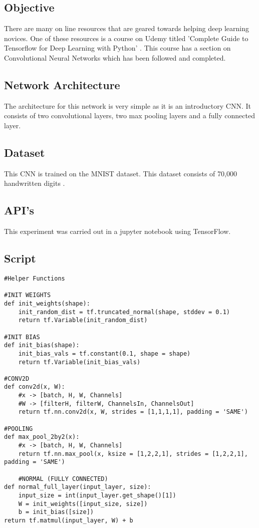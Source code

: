 \subsection*{Objective}
There are many on line resources that are geared towards helping deep learning novices.
One of these resources is a course on Udemy titled 'Complete Guide to Tensorflow for Deep Learning with Python' \parencite{udemy}.
This course has a section on Convolutional Neural Networks which has been followed and completed.

\subsection*{Network Architecture}
The architecture for this network is very simple as it is an introductory CNN.
It consists of two convolutional layers, two max pooling layers and a fully connected layer.

\subsection*{Dataset}
This CNN is trained on the MNIST dataset.
This dataset consists of 70,000 handwritten digits \parencite{mnist}.

\subsection*{API's}
This experiment was carried out in a jupyter notebook using TensorFlow.

\subsection*{Script}
\begin{lstlisting}[style=Python]
#Helper Functions

#INIT WEIGHTS
def init_weights(shape):
    init_random_dist = tf.truncated_normal(shape, stddev = 0.1)
    return tf.Variable(init_random_dist)

#INIT BIAS
def init_bias(shape):
    init_bias_vals = tf.constant(0.1, shape = shape)
    return tf.Variable(init_bias_vals)

#CONV2D
def conv2d(x, W):
    #x -> [batch, H, W, Channels]
    #W -> [filterH, filterW, ChannelsIn, ChannelsOut]
    return tf.nn.conv2d(x, W, strides = [1,1,1,1], padding = 'SAME')

#POOLING
def max_pool_2by2(x):
    #x -> [batch, H, W, Channels]
    return tf.nn.max_pool(x, ksize = [1,2,2,1], strides = [1,2,2,1], padding = 'SAME')

    #NORMAL (FULLY CONNECTED)
def normal_full_layer(input_layer, size):
    input_size = int(input_layer.get_shape()[1])
    W = init_weights([input_size, size])
    b = init_bias([size])
return tf.matmul(input_layer, W) + b
\end{lstlisting}

